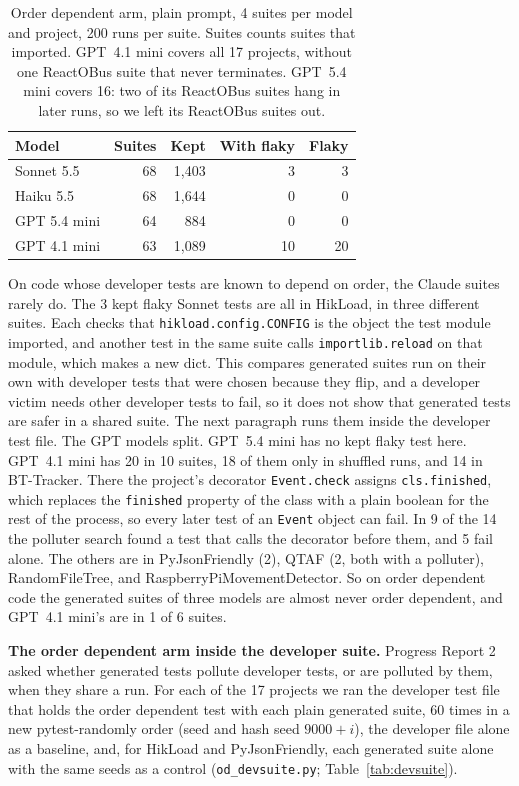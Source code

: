 \begin{table}[htbp]
\caption{Order dependent arm, plain prompt, 4 suites per model and project, 200 runs per suite. Suites counts suites that imported. GPT~4.1 mini covers all 17 projects, without one ReactOBus suite that never terminates. GPT~5.4 mini covers 16: two of its ReactOBus suites hang in later runs, so we left its ReactOBus suites out.}
\label{tab:odarm}
\small
\setlength{\tabcolsep}{3pt}
\begin{tabularx}{\columnwidth}{Xrrrr}
\toprule
Model & Suites & Kept & With flaky & Flaky \\
\midrule
Sonnet 5.5 & 68 & 1,403 & 3 & 3 \\
Haiku 5.5 & 68 & 1,644 & 0 & 0 \\
GPT 5.4 mini & 64 & 884 & 0 & 0 \\
GPT 4.1 mini & 63 & 1,089 & 10 & 20 \\
\bottomrule
\end{tabularx}
\end{table}

On code whose developer tests are known to depend on order, the Claude suites rarely do. The 3 kept flaky Sonnet tests are all in HikLoad, in three different suites. Each checks that \texttt{hikload.config.CONFIG} is the object the test module imported, and another test in the same suite calls \texttt{importlib.reload} on that module, which makes a new dict. This compares generated suites run on their own with developer tests that were chosen because they flip, and a developer victim needs other developer tests to fail, so it does not show that generated tests are safer in a shared suite. The next paragraph runs them inside the developer test file. The GPT models split. GPT~5.4 mini has no kept flaky test here. GPT~4.1 mini has 20 in 10 suites, 18 of them only in shuffled runs, and 14 in BT-Tracker. There the project's decorator \texttt{Event.check} assigns \texttt{cls.finished}, which replaces the \texttt{finished} property of the class with a plain boolean for the rest of the process, so every later test of an \texttt{Event} object can fail. In 9 of the 14 the polluter search found a test that calls the decorator before them, and 5 fail alone. The others are in PyJsonFriendly (2), QTAF (2, both with a polluter), RandomFileTree, and RaspberryPiMovementDetector. So on order dependent code the generated suites of three models are almost never order dependent, and GPT~4.1 mini's are in 1 of 6 suites.

\textbf{The order dependent arm inside the developer suite.} Progress Report 2 asked whether generated tests pollute developer tests, or are polluted by them, when they share a run. For each of the 17 projects we ran the developer test file that holds the order dependent test with each plain generated suite, 60 times in a new pytest-randomly order (seed and hash seed $9000+i$), the developer file alone as a baseline, and, for HikLoad and PyJsonFriendly, each generated suite alone with the same seeds as a control (\texttt{od\_devsuite.py}; Table~\ref{tab:devsuite}).

